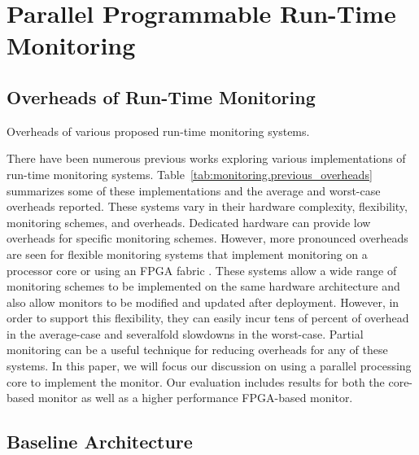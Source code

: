 \section{Parallel Programmable Run-Time Monitoring}
\label{sec:monitoring}

\subsection{Overheads of Run-Time Monitoring}

\begin{table}[tb]
  \begin{center}
    \vspace{-0.0in}
    \begin{footnotesize}
    
    \end{footnotesize}
    \caption{Overheads of various proposed run-time monitoring systems.}
    \vspace{-0.2in}
    \label{tab:monitoring.previous_overheads}
  \end{center}
\end{table}

There have been numerous previous works exploring various implementations of
run-time monitoring systems. Table~\ref{tab:monitoring.previous_overheads}
summarizes some of these implementations and the average and worst-case
overheads reported. These systems vary in their hardware complexity,
flexibility, monitoring schemes, and overheads. Dedicated hardware can provide low 
overheads for specific monitoring schemes. However, more pronounced overheads are seen for 
flexible monitoring systems that implement monitoring on a processor core
\cite{lba-asid06, lba-isca08, nagarajan-interact08} or using an FPGA fabric
\cite{flexcore-micro10}. These systems allow a wide range of monitoring schemes to
be implemented on the same hardware architecture and also allow monitors to be modified and updated after deployment. However, in order to support this flexibility, they can easily incur tens of percent of
overhead in the average-case and severalfold slowdowns in the worst-case. Partial monitoring
can be a useful technique for reducing overheads for any of these systems.
In this paper, we will focus our discussion on using a parallel
processing core to implement the monitor. Our evaluation includes results
for both the core-based monitor as well as a higher performance FPGA-based monitor.

\subsection{Baseline Architecture}

